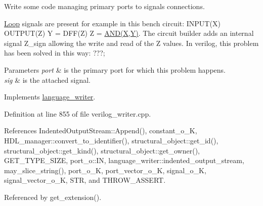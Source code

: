Write some code managing primary ports to signals connections. 

\hyperlink{classLoop}{Loop} signals are present for example in this bench circuit\+: I\+N\+P\+U\+T(\+X) O\+U\+T\+P\+U\+T(\+Z) Y = D\+F\+F(\+Z) Z = \hyperlink{tutorial__pnnl__2019_2memory_2third_2solution_2mips_8c_acd1b97556dfbbac61063a63031d2f91d}{A\+N\+D(\+X,\+Y)}. The circuit builder adds an internal signal Z\+\_\+sign allowing the write and read of the Z values. In verilog, this problem has been solved in this way\+: ???; 
\begin{DoxyParams}{Parameters}
{\em port} & is the primary port for which this problem happens. \\
\hline
{\em sig} & is the attached signal. \\
\hline
\end{DoxyParams}


Implements \hyperlink{classlanguage__writer_a1789bbe12e4b1e4f168f4cc25bb7faff}{language\+\_\+writer}.



Definition at line 855 of file verilog\+\_\+writer.\+cpp.



References Indented\+Output\+Stream\+::\+Append(), constant\+\_\+o\+\_\+K, H\+D\+L\+\_\+manager\+::convert\+\_\+to\+\_\+identifier(), structural\+\_\+object\+::get\+\_\+id(), structural\+\_\+object\+::get\+\_\+kind(), structural\+\_\+object\+::get\+\_\+owner(), G\+E\+T\+\_\+\+T\+Y\+P\+E\+\_\+\+S\+I\+ZE, port\+\_\+o\+::\+IN, language\+\_\+writer\+::indented\+\_\+output\+\_\+stream, may\+\_\+slice\+\_\+string(), port\+\_\+o\+\_\+K, port\+\_\+vector\+\_\+o\+\_\+K, signal\+\_\+o\+\_\+K, signal\+\_\+vector\+\_\+o\+\_\+K, S\+TR, and T\+H\+R\+O\+W\+\_\+\+A\+S\+S\+E\+RT.



Referenced by get\+\_\+extension().

